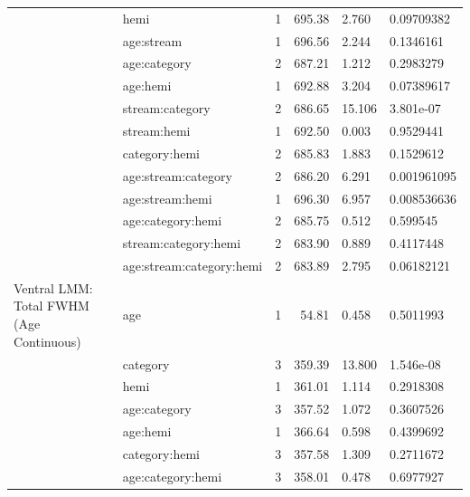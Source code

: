 \begin{table}
\begin{tabular}{llrrll}
\addlinespace
 & hemi & 1 & 695.38 & 2.760 & 0.09709382\\
 & age:stream & 1 & 696.56 & 2.244 & 0.1346161\\
 & age:category & 2 & 687.21 & 1.212 & 0.2983279\\
 & age:hemi & 1 & 692.88 & 3.204 & 0.07389617\\
 & stream:category & 2 & 686.65 & 15.106 & 3.801e-07\\
\addlinespace
 & stream:hemi & 1 & 692.50 & 0.003 & 0.9529441\\
 & category:hemi & 2 & 685.83 & 1.883 & 0.1529612\\
 & age:stream:category & 2 & 686.20 & 6.291 & 0.001961095\\
 & age:stream:hemi & 1 & 696.30 & 6.957 & 0.008536636\\
 & age:category:hemi & 2 & 685.75 & 0.512 & 0.599545\\
\addlinespace
 & stream:category:hemi & 2 & 683.90 & 0.889 & 0.4117448\\
 & age:stream:category:hemi & 2 & 683.89 & 2.795 & 0.06182121\\
Ventral LMM: Total FWHM (Age Continuous) & age & 1 & 54.81 & 0.458 & 0.5011993\\
 & category & 3 & 359.39 & 13.800 & 1.546e-08\\
 & hemi & 1 & 361.01 & 1.114 & 0.2918308\\
\addlinespace
 & age:category & 3 & 357.52 & 1.072 & 0.3607526\\
 & age:hemi & 1 & 366.64 & 0.598 & 0.4399692\\
 & category:hemi & 3 & 357.58 & 1.309 & 0.2711672\\
 & age:category:hemi & 3 & 358.01 & 0.478 & 0.6977927\\
\bottomrule
\end{tabular}
\end{table}
